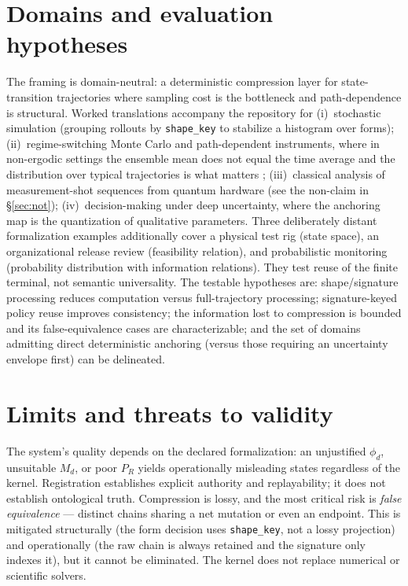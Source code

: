 \documentclass[11pt,a4paper]{article}
\begin{document}
\section{Domains and evaluation hypotheses}
The framing is domain-neutral: a deterministic compression layer for
state-transition trajectories where sampling cost is the bottleneck and
path-dependence is structural. Worked translations accompany the repository for
(i)~stochastic simulation (grouping rollouts by \texttt{shape\_key} to stabilize a
histogram over forms); (ii)~regime-switching Monte Carlo and path-dependent
instruments, where in non-ergodic settings the ensemble mean does not equal the
time average and the distribution over typical trajectories is what matters
\cite{peters2019,hamilton1989}; (iii)~classical analysis of measurement-shot
sequences from quantum hardware (see the non-claim in \S\ref{sec:not});
(iv)~decision-making under deep uncertainty, where the anchoring map is the
quantization of qualitative parameters. Three deliberately distant formalization
examples additionally cover a physical test rig (state space), an organizational
release review (feasibility relation), and probabilistic monitoring (probability
distribution with information relations). They test reuse of the finite terminal,
not semantic universality. The testable hypotheses are: shape/signature
processing reduces computation versus full-trajectory processing; signature-keyed
policy reuse improves consistency; the information lost to compression is bounded
and its false-equivalence cases are characterizable; and the set of domains
admitting direct deterministic anchoring (versus those requiring an uncertainty
envelope first) can be delineated.

\section{Limits and threats to validity}
The system's quality depends on the declared formalization: an unjustified
$\phi_d$, unsuitable $M_d$, or poor $P_R$ yields operationally misleading states
regardless of the kernel. Registration establishes explicit authority and
replayability; it does not establish ontological truth. Compression is lossy, and the most
critical risk is \emph{false equivalence} --- distinct chains sharing a net mutation
or even an endpoint. This is mitigated structurally (the form decision uses
\texttt{shape\_key}, not a lossy projection) and operationally (the raw chain is
always retained and the signature only indexes it), but it cannot be eliminated.
The kernel does not replace numerical or scientific solvers.
\end{document}
